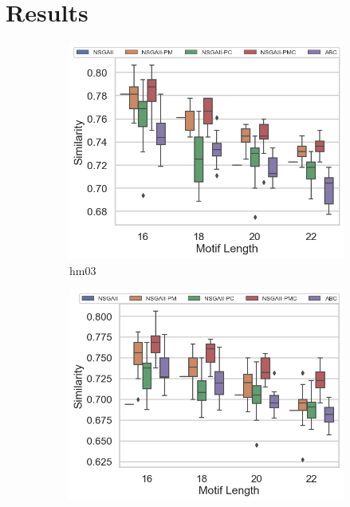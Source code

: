 \section{Results}
\label{sec:results}

\begin{figure}[!htbp]
	\centering
	\begin{adjustwidth}{-1cm}{-1cm}
		\begin{subfigure}[b]{0.4\textwidth}
			\includegraphics[width=\textwidth]{Figure/hm03_all_boxplot}
			\caption{hm03}
		\end{subfigure}%
		\begin{subfigure}[b]{0.4\textwidth}
			\includegraphics[width=\textwidth]{Figure/hm09g_all_boxplot}

\end{subfigure}
\end{adjustwidth}
\end{figure}
